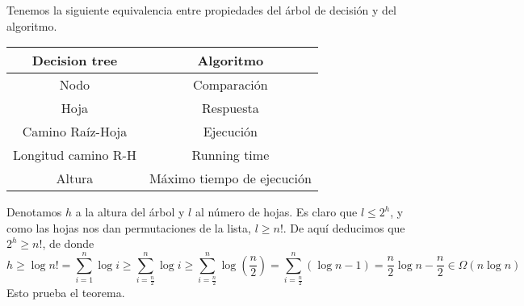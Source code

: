 \documentclass[AL.tex]{subfiles}
\begin{document}
Tenemos la siguiente equivalencia entre propiedades del árbol de decisión y del algoritmo. 
\begin{center}
\begin{tabular}{c|c}
Decision tree & Algoritmo\\
\hline
Nodo & Comparación\\
Hoja & Respuesta\\
Camino Raíz-Hoja & Ejecución\\
Longitud camino R-H & Running time\\
Altura & Máximo tiempo de ejecución
\end{tabular}
\end{center}

Denotamos $h$ a la altura del árbol y $l$ al número de hojas. Es claro que $l\leq 2^h$, y como las hojas nos dan permutaciones de la lista, $l\geq n!$. De aquí deducimos que $2^h\geq n!$, de donde 
$$h\geq \log n!=\sum_{i=1}^n\log i\geq \sum_{i=\frac{n}{2}}^n\log i\geq \sum_{i=\frac{n}{2}}^n\log\left(\frac{n}{2}\right)=\sum_{i=\frac{n}{2}}^n(\log n-1)=\frac{n}{2}\log n-\frac{n}{2}\in\Omega(n\log n)$$
Esto prueba el teorema. 
\end{document}

